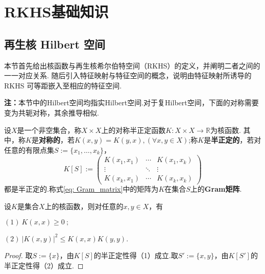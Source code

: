 \documentclass[../master.tex]{subfiles}
\begin{document}
\chapter{RKHS基础知识}
\section{再生核 Hilbert 空间}
本节首先给出核函数与再生核希尔伯特空间（RKHS）的定义，并阐明二者之间的一一对应关系. 随后引入特征映射与特征空间的概念，说明由特征映射所诱导的 RKHS 可等距嵌入至相应的特征空间.

\textbf{注：}本节中的Hilbert空间均指实Hilbert空间.对于复Hilbert空间，下面的对称需要变为共轭对称，其余推导相似.

\begin{definition}[核函数]
    设$X$是一个非空集合，称$X\times X$上的对称半正定函数$K:X\times X\to\mathbb{R}$为核函数.
    其中，称$K$是\textbf{对称的}，若$K(x,y)=K(y,x),(\forall x,y\in X)$;称$K$是\textbf{半正定的}，若对任意的有限点集$S:=\{x_1,\dots,x_k\}$，
    \begin{equation}\label{eq: Gram_matrix}
        K[S]:=\begin{pmatrix}
            K(x_1,x_1)&\cdots&K(x_1,x_k)\\
            \vdots&\ddots&\vdots\\
            K(x_k,x_1)&\cdots&K(x_k,x_k)
        \end{pmatrix}
    \end{equation}
    都是半正定的.称式\eqref{eq: Gram_matrix}中的矩阵为$K$在集合$S$上的\textbf{Gram矩阵}.
\end{definition}

\begin{theorem}[核函数性质]\label{thm:对称半正定K(xx)>0}
    设$K$是集合$X$上的核函数，则对任意的$x,y\in X$，有

    $(1)~K(x,x)\geq 0~;$
    
    $(2)~\left|K(x,y)\right|^2\leq K(x,x)K(y,y)$.
\end{theorem}

\begin{proof}
    取$S:=\{x\}$，由$K[S]$的半正定性得（1）成立.取$S':=\{x,y\}$，由$K[S']$的半正定性得（2）成立.
\end{proof}
\end{document}
